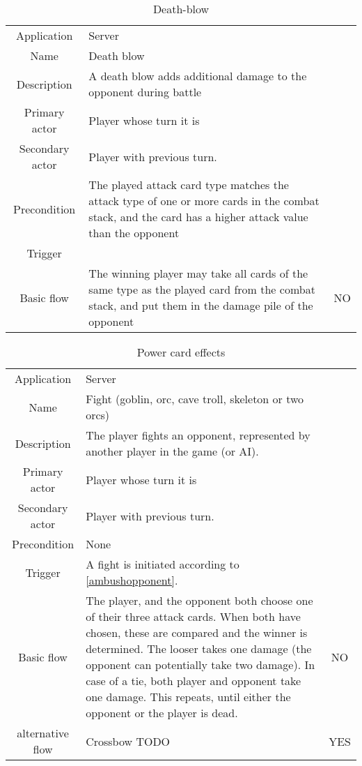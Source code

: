 \documentclass[a4paper,10pt]{report}
\begin{document}
\begin{table}
\caption{Death-blow}
\label{fight_deathblow}
\begin{tabular}{|c| p{9cm}|c}
\hline
Application & Server & \\
Name & Death blow & \\
Description & A death blow adds additional damage to the opponent during battle & \\
Primary actor & Player whose turn it is & \\
Secondary actor & Player with previous turn. & \\
Precondition & The played attack card type matches the attack type of one or more cards in the combat stack, and the card has a higher attack value than the opponent & \\
Trigger &  & \\ \hline
Basic flow & The winning player may take all cards of the same type as the played card from the combat stack, and put them in the damage pile of the opponent & NO\\
\hline
\end{tabular}
\end{table}



\begin{table}
\caption{Power card effects}
\label{fight_powercard}
\begin{tabular}{|c| p{9cm}|c}
\hline
Application & Server & \\
Name & Fight (goblin, orc, cave troll, skeleton or two orcs) & \\
Description & The player fights an opponent, represented by another player in the game (or AI). & \\
Primary actor & Player whose turn it is & \\
Secondary actor & Player with previous turn. & \\
Precondition & None & \\
Trigger & A fight is initiated according to \ref{ambushopponent}. & \\ \hline
Basic flow & The player, and the opponent both choose one of their three attack cards. When both have chosen, these are compared and the winner is determined. The looser takes one damage (the opponent can potentially take two damage). In case of a tie, both player and opponent take one damage. This repeats, until either the opponent or the player is dead. & NO\\ \hline
alternative flow & Crossbow TODO & YES\\
\hline
\end{tabular}
\end{table}
\end{document}
